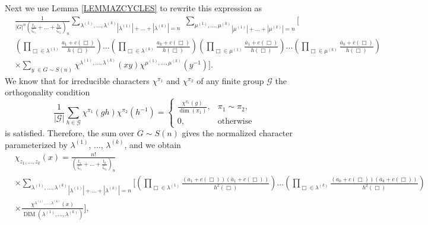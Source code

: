 \documentclass[12pt]{amsart}
\theoremstyle{definition}
\numberwithin{equation}{section}
\DeclareMathOperator{\DIM}{DIM}
\begin{document}
Next  we use Lemma \ref{LEMMAZCYCLES} to rewrite this expression as
\begin{equation}
\begin{split}
&\frac{1}{\left|G\right|^n
\left(\frac{t_1}{\zeta_{c_1}}+\ldots+\frac{t_k}{\zeta_{c_k}}\right)_n}
\underset{|\lambda^{(1)}|+\ldots+|\lambda^{(k)}|=n}{\sum\limits_{\lambda^{(1)},\ldots,\lambda^{(k)}}}
\;
\underset{|\mu^{(1)}|+\ldots+|\mu^{(k)}|=n}{\sum\limits_{\mu^{(1)},\ldots,\mu^{(k)}}}
\biggl[\\
&\left(\prod\limits_{\Box\in\lambda^{(1)}}\frac{a_1+c(\Box)}{h(\Box)}\right)
\ldots\left(\prod\limits_{\Box\in\lambda^{(k)}}\frac{a_k+c(\Box)}{h(\Box)}\right)
\left(\prod\limits_{\Box\in\mu^{(1)}}\frac{\bar{a}_1+c(\Box)}{h(\Box)}\right)
\ldots\left(\prod\limits_{\Box\in\mu^{(k)}}\frac{\bar{a}_k+c(\Box)}{h(\Box)}\right)\\
&\times\sum\limits_{y\;\in G\sim S(n)}\chi^{\lambda^{(1)},\ldots,\lambda^{(k)}}(xy)
\chi^{\mu^{(1)},\ldots,\mu^{(k)}}(y^{-1})
\biggr].
\nonumber
\end{split}
\end{equation}
We know that for irreducible characters $\chi^{\pi_1}$ and $\chi^{\pi_2}$
of any finite group $\mathcal{G}$ the orthogonality condition
\begin{equation}
\frac{1}{\left|\mathcal{G}\right|}\sum\limits_{h\in\mathcal{G}}\chi^{\pi_1}(gh)\chi^{\pi_2}(h^{-1})=
\left\{
\begin{array}{ll}
\frac{\chi^{\pi_1}(g)}{\dim(\pi_1)}, & \pi_1\sim\pi_2,\\
0, & \mbox{otherwise}
\end{array}
\right.
\end{equation}
is satisfied. Therefore, the sum over $G\sim S(n)$ gives the normalized character parameterized by $\lambda^{(1)}$, $\ldots$, $\lambda^{(k)}$, and we obtain
\begin{equation}
\begin{split}
&\chi_{z_1,\ldots,z_k}(x)=
\frac{n!}{
\left(\frac{t_1}{\zeta_{c_1}}+\ldots+\frac{t_k}{\zeta_{c_k}}\right)_n}\\
&\times
\underset{|\lambda^{(1)}|+\ldots+|\lambda^{(k)}|=n}{\sum\limits_{\lambda^{(1)},\ldots,\lambda^{(k)}}}\biggl[
\left(\prod\limits_{\Box\in\lambda^{(1)}}\frac{\left(a_1+c(\Box)\right)\left(\bar{a}_1+c(\Box)\right)}{h^2(\Box)}\right)
\ldots\left(\prod\limits_{\Box\in\lambda^{(k)}}\frac{\left(a_k+c(\Box)\right)\left(\bar{a}_k+c(\Box)\right)}{h^2(\Box)}\right)\\
&\times\frac{\chi^{\lambda^{(1)},\ldots,\lambda^{(k)}}(x)}{\DIM(\lambda^{(1)},\ldots,\lambda^{(k)})}\biggr],
\nonumber
\end{split}
\end{equation}
\end{document}

